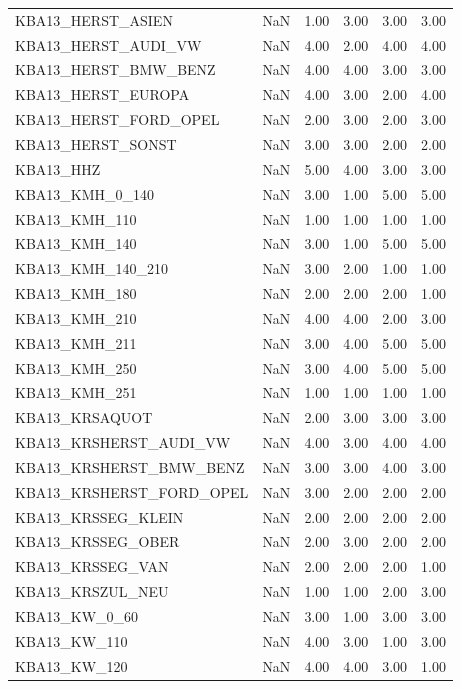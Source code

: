 \begin{longtable}{lp{1cm}p{1cm}p{1cm}p{1cm}p{1cm}}
KBA13\_HERST\_ASIEN  & NaN & 1.00 & 3.00 & 3.00 & 3.00 \\
KBA13\_HERST\_AUDI\_VW  & NaN & 4.00 & 2.00 & 4.00 & 4.00 \\
KBA13\_HERST\_BMW\_BENZ & NaN & 4.00 & 4.00 & 3.00 & 3.00 \\
KBA13\_HERST\_EUROPA & NaN & 4.00 & 3.00 & 2.00 & 4.00 \\
KBA13\_HERST\_FORD\_OPEL   & NaN & 2.00 & 3.00 & 2.00 & 3.00 \\
KBA13\_HERST\_SONST  & NaN & 3.00 & 3.00 & 2.00 & 2.00 \\
KBA13\_HHZ & NaN & 5.00 & 4.00 & 3.00 & 3.00 \\
KBA13\_KMH\_0\_140  & NaN & 3.00 & 1.00 & 5.00 & 5.00 \\
KBA13\_KMH\_110    & NaN & 1.00 & 1.00 & 1.00 & 1.00 \\
KBA13\_KMH\_140    & NaN & 3.00 & 1.00 & 5.00 & 5.00 \\
KBA13\_KMH\_140\_210  & NaN & 3.00 & 2.00 & 1.00 & 1.00 \\
KBA13\_KMH\_180    & NaN & 2.00 & 2.00 & 2.00 & 1.00 \\
KBA13\_KMH\_210    & NaN & 4.00 & 4.00 & 2.00 & 3.00 \\
KBA13\_KMH\_211    & NaN & 3.00 & 4.00 & 5.00 & 5.00 \\
KBA13\_KMH\_250    & NaN & 3.00 & 4.00 & 5.00 & 5.00 \\
KBA13\_KMH\_251    & NaN & 1.00 & 1.00 & 1.00 & 1.00 \\
KBA13\_KRSAQUOT   & NaN & 2.00 & 3.00 & 3.00 & 3.00 \\
KBA13\_KRSHERST\_AUDI\_VW  & NaN & 4.00 & 3.00 & 4.00 & 4.00 \\
KBA13\_KRSHERST\_BMW\_BENZ   & NaN & 3.00 & 3.00 & 4.00 & 3.00 \\
KBA13\_KRSHERST\_FORD\_OPEL  & NaN & 3.00 & 2.00 & 2.00 & 2.00 \\
KBA13\_KRSSEG\_KLEIN & NaN & 2.00 & 2.00 & 2.00 & 2.00 \\
KBA13\_KRSSEG\_OBER  & NaN & 2.00 & 3.00 & 2.00 & 2.00 \\
KBA13\_KRSSEG\_VAN   & NaN & 2.00 & 2.00 & 2.00 & 1.00 \\
KBA13\_KRSZUL\_NEU   & NaN & 1.00 & 1.00 & 2.00 & 3.00 \\
KBA13\_KW\_0\_60    & NaN & 3.00 & 1.00 & 3.00 & 3.00 \\
KBA13\_KW\_110  & NaN & 4.00 & 3.00 & 1.00 & 3.00 \\
KBA13\_KW\_120  & NaN & 4.00 & 4.00 & 3.00 & 1.00 \\

\end{longtable}
